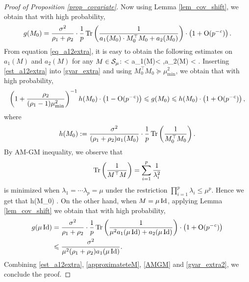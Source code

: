 \begin{proof}[Proof of Proposition \ref{prop_covariate}]
Now using Lemma \ref{lem_cov_shift}, we obtain that with high probability,
\begin{align}\label{gvar_extra}
g(M_0)= \frac{\sigma^2}{\rho_1+\rho_2}\cdot \frac1p\tr\left( \frac{1}{a_1(M_0)\cdot M_0^\top M_0 + a_2(M_0)}\right) \cdot \left(1 +\OO(p^{-\e})\right).
\end{align}
From equation \eqref{eq_a12extra}, it is easy to obtain the following estimates on $ a_1(M)$ and $a_2(M)$ for any $M\in \cal S_\mu$:
\be\label{est_a12extra}
 < a_1(M)<  ,\quad a_2(M) < .
\ee
Inserting \eqref{est_a12extra} into \eqref{gvar_extra} and using $ M_0^\top M_0\succeq \mu_{\min}^2$, we obtain that with high probability,
\begin{align}\label{approximateteM}
\left(1+\frac{\rho_2}{(\rho_1-1)\mu_{\min}^2}\right)^{-1}h(M_0) \cdot \left(1 - \OO(p^{-\e})\right) \le g(M_0) \le h(M_0) \cdot \left(1 +\OO(p^{-\e})\right),
\end{align}
where
$$h(M_0):=\frac{\sigma^2}{(\rho_1+\rho_2)a_1(M_0)}\cdot \frac1p\tr\left( \frac{1}{M_0^\top M_0}\right) .$$
%
By AM-GM inequality, we observe that 
$$\tr\left( \frac{1}{M^\top M}\right) = \sum_{i=1}^p\frac{1}{\lambda_i^2}$$
is minimized when $\lambda_1 = \cdots\lambda_p=\mu$ under the restriction $\prod_{i=1}^p\lambda_i\le \mu^p$. Hence we get that 
\be\label{AMGM} h(M_0) \le {}.\ee
On the other hand, when $M=\mu \id$, applying Lemma \ref{lem_cov_shift} we obtain that with high probability,
\begin{align}\label{gvar_extra2}
\begin{split}
g(\mu \id)&= \frac{\sigma^2}{\rho_1+\rho_2}\cdot \frac1p\tr\left( \frac{1}{\mu^2 a_1 (\mu\id) + a_2(\mu\id)}\right) \cdot \left(1 +\OO(p^{-\e})\right)\\
&\le \frac{\sigma^2}{\mu^2(\rho_1+\rho_2)a_1 (\mu\id)}.
\end{split}
\end{align}
Combining \eqref{est_a12extra}, \eqref{approximateteM}, \eqref{AMGM} and \eqref{gvar_extra2}, we conclude the proof.
\end{proof}

